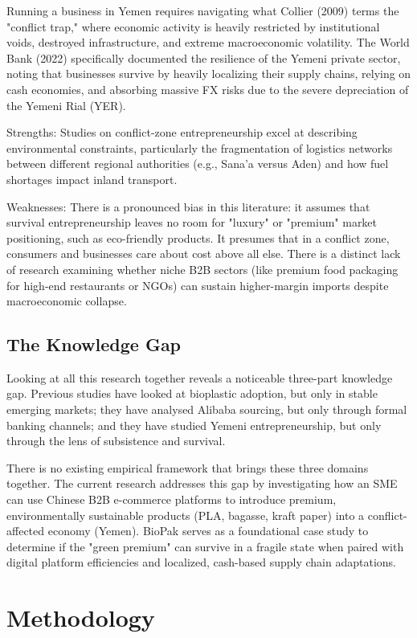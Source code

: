 \documentclass[12pt,a4paper]{article}
\begin{document}
Running a business in Yemen requires navigating what Collier (2009) terms the "conflict trap," where economic activity is heavily restricted by institutional voids, destroyed infrastructure, and extreme macroeconomic volatility. The World Bank (2022) specifically documented the resilience of the Yemeni private sector, noting that businesses survive by heavily localizing their supply chains, relying on cash economies, and absorbing massive FX risks due to the severe depreciation of the Yemeni Rial (YER).

Strengths: Studies on conflict-zone entrepreneurship excel at describing environmental constraints, particularly the fragmentation of logistics networks between different regional authorities (e.g., Sana'a versus Aden) and how fuel shortages impact inland transport.

Weaknesses: There is a pronounced bias in this literature: it assumes that survival entrepreneurship leaves no room for "luxury" or "premium" market positioning, such as eco-friendly products. It presumes that in a conflict zone, consumers and businesses care about cost above all else. There is a distinct lack of research examining whether niche B2B sectors (like premium food packaging for high-end restaurants or NGOs) can sustain higher-margin imports despite macroeconomic collapse.

\subsection{The Knowledge Gap}

Looking at all this research together reveals a noticeable three-part knowledge gap. Previous studies have looked at bioplastic adoption, but only in stable emerging markets; they have analysed Alibaba sourcing, but only through formal banking channels; and they have studied Yemeni entrepreneurship, but only through the lens of subsistence and survival.

There is no existing empirical framework that brings these three domains together. The current research addresses this gap by investigating how an SME can use Chinese B2B e-commerce platforms to introduce premium, environmentally sustainable products (PLA, bagasse, kraft paper) into a conflict-affected economy (Yemen). BioPak serves as a foundational case study to determine if the "green premium" can survive in a fragile state when paired with digital platform efficiencies and localized, cash-based supply chain adaptations.

\section{Methodology}
\end{document}
